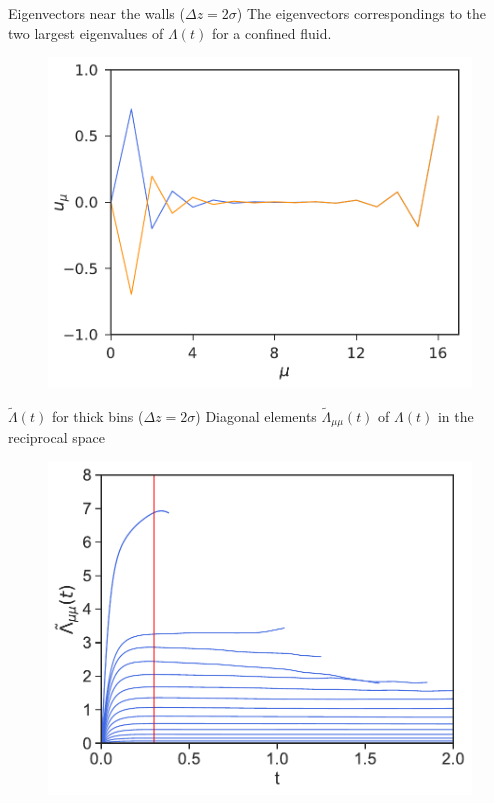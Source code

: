 \documentclass{beamer}
\begin{document}
\begin{frame}{Eigenvectors near the walls ($\Delta z=2\sigma$)}
 The eigenvectors correspondings to the two largest eigenvalues of $\Lambda(t)$ for a confined fluid.
  \begin{figure}[h!]
\includegraphics[scale=0.5]{Eigenvectors-WALLS-17nodes}
\end{figure}
\end{frame}

\begin{frame}{$\tilde{\Lambda}(t)$ for thick bins ($\Delta z=2\sigma$)}
    Diagonal elements  $\tilde{\Lambda}_{\mu\mu}(t)$ of $\Lambda(t)$ in the reciprocal space
\begin{figure}[h!]
\includegraphics[scale=0.5]{LambdatRec-WALLS-17nodes}
\end{figure}
\end{frame}
\end{document}
